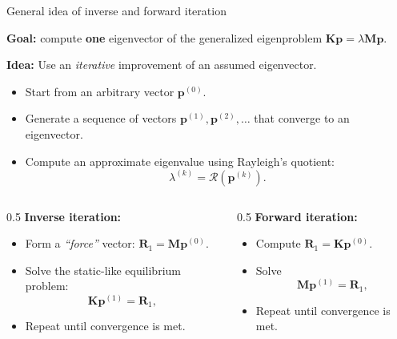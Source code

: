 \documentclass[aspectratio=169]{beamer}
\begin{document}
\begin{frame}{General idea of inverse and forward iteration}
  \vspace{-0.2cm}
  \small
  \begin{block}{}
    \textbf{Goal:} compute \textbf{one} eigenvector of the generalized eigenproblem \( \mathbf K\mathbf p = \lambda\mathbf M \mathbf p \).
  \end{block}
  \textbf{Idea:} Use an \emph{iterative} improvement of an assumed eigenvector.
  \begin{itemize}
    \item Start from an arbitrary vector $\mathbf p^{(0)}$.
    \item Generate a sequence of vectors $\mathbf p^{(1)}, \mathbf p^{(2)}, \dots$ that converge to an eigenvector.
    \item  Compute an approximate eigenvalue using Rayleigh's quotient:
          \[
            \lambda^{(k)} = \mathcal R(\mathbf p^{(k)}).
          \]
  \end{itemize}
  \begin{columns}[T]
    \begin{column}{0.5\textwidth}
      \textbf{Inverse iteration:}
      \begin{itemize}
        \item Form a \emph{“force”} vector:
              \(
              \mathbf R_1 = \mathbf M \mathbf p^{(0)}.
              \)
        \item Solve the static-like equilibrium problem:
              \[
                \mathbf K \mathbf p^{(1)} = \mathbf R_1,
              \]
        \item Repeat until convergence is met.
      \end{itemize}
    \end{column}
    \begin{column}{0.5\textwidth}
      \textbf{Forward iteration:}
      \begin{itemize}
        \item Compute $\mathbf R_1 = \mathbf K \mathbf p^{(0)}$.
        \item Solve
              \[
                \mathbf M \mathbf p^{(1)} = \mathbf R_1 ,
              \]
        \item Repeat until convergence is met.
      \end{itemize}
    \end{column}
  \end{columns}
\end{frame}
\end{document}
